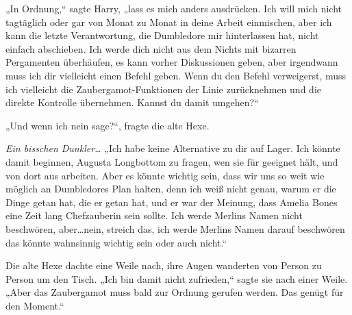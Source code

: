 „In Ordnung,“ sagte Harry, „lass es mich anders ausdrücken. Ich will mich nicht tagtäglich oder gar von Monat zu Monat in deine Arbeit einmischen, aber ich kann die letzte Verantwortung, die Dumbledore mir hinterlassen hat, nicht einfach abschieben. Ich werde dich nicht aus dem Nichts mit bizarren Pergamenten überhäufen, es kann vorher Diskussionen geben, aber irgendwann muss ich dir vielleicht einen Befehl geben. Wenn du den Befehl verweigerst, muss ich vielleicht die Zaubergamot-Funktionen der Linie zurücknehmen und die direkte Kontrolle übernehmen. Kannst du damit umgehen?“

„Und wenn ich nein sage?“, fragte die alte Hexe.

\emph{Ein bisschen Dunkler…}
„Ich habe keine Alternative zu dir auf Lager. Ich könnte damit beginnen, Augusta Longbottom zu fragen, wen sie für geeignet hält, und von dort aus arbeiten. Aber es könnte wichtig sein, dass wir uns so weit wie möglich an Dumbledores Plan halten, denn ich weiß nicht genau, warum er die Dinge getan hat, die er getan hat, und er war der Meinung, dass Amelia Bones eine Zeit lang Chefzauberin sein sollte. Ich werde Merlins Namen nicht beschwören, aber…nein, streich das, ich werde Merlins Namen darauf beschwören das könnte wahnsinnig wichtig sein oder auch nicht.“

Die alte Hexe dachte eine Weile nach, ihre Augen wanderten von Person zu Person um den Tisch. „Ich bin damit nicht zufrieden,“ sagte sie nach einer Weile.
„Aber das Zaubergamot muss bald zur Ordnung gerufen werden. Das genügt für den Moment.“

